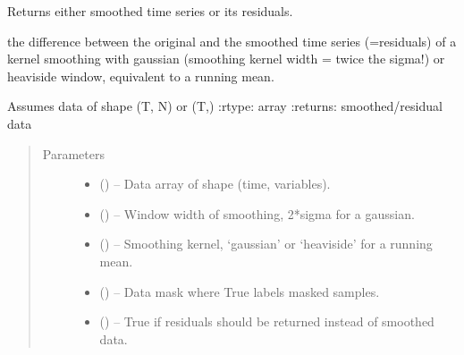 \documentclass[letterpaper,10pt,english]{sphinxmanual}
\begin{document}

\begin{fulllineitems}
\label{\detokenize{index:tigramite.data_processing.smooth}}
Returns either smoothed time series or its residuals.

the difference between the original and the smoothed time series
(=residuals) of a kernel smoothing with gaussian (smoothing kernel width =
twice the sigma!) or heaviside window, equivalent to a running mean.

Assumes data of shape (T, N) or (T,)
:rtype: array
:returns: smoothed/residual data
\begin{quote}\begin{description}
\item[{Parameters}] \leavevmode\begin{itemize}
\item {} 
 () -- Data array of shape (time, variables).

\item {} 
 () -- Window width of smoothing, 2*sigma for a gaussian.

\item {} 
 (\sphinxstyleliteralemphasis{, }\sphinxstyleliteralemphasis{ (}\sphinxstyleliteralemphasis{)}\sphinxstyleliteralemphasis{}) -- Smoothing kernel, `gaussian' or `heaviside' for a running mean.

\item {} 
 (\sphinxstyleliteralemphasis{, }\sphinxstyleliteralemphasis{ (}\sphinxstyleliteralemphasis{)}\sphinxstyleliteralemphasis{}) -- Data mask where True labels masked samples.

\item {} 
 (\sphinxstyleliteralemphasis{, }\sphinxstyleliteralemphasis{ (}\sphinxstyleliteralemphasis{)}\sphinxstyleliteralemphasis{}) -- True if residuals should be returned instead of smoothed data.


\end{itemize}
\end{description}
\end{quote}
\end{fulllineitems}
\end{document}
